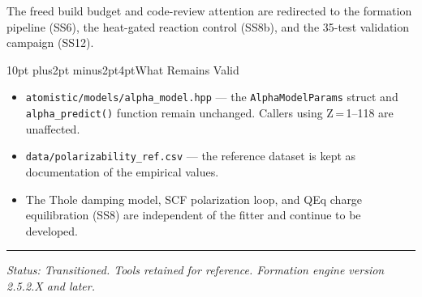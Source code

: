 \documentclass[11pt, a4paper]{article}
\makeatletter
\renewcommand{\section}{\@startsection{section}{1}{\z@}%
  {10pt plus2pt minus2pt}{4pt}{\large\bfseries}}
\makeatother
\begin{document}
The freed build budget and code-review attention are redirected to the
formation pipeline (SS6), the heat-gated reaction control (SS8b), and
the 35-test validation campaign (SS12).

\section{What Remains Valid}

\begin{itemize}
  \item \texttt{atomistic/models/alpha\_model.hpp} ---
        the \texttt{AlphaModelParams} struct and \texttt{alpha\_predict()}
        function remain unchanged.  Callers using Z\,=\,1--118 are
        unaffected.
  \item \texttt{data/polarizability\_ref.csv} ---
        the reference dataset is kept as documentation of the empirical values.
  \item The Thole damping model, SCF polarization loop, and QEq charge
        equilibration (SS8) are independent of the fitter and continue
        to be developed.
\end{itemize}

\vspace{1em}
\hrule
\vspace{0.4em}
{\small\textit{Status: Transitioned. Tools retained for reference.
Formation engine version 2.5.2.X and later.}}
\end{document}
